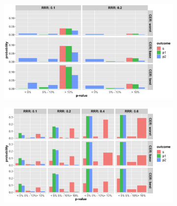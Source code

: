 \documentclass[]{article}
\begin{document}
\begin{figure}
\centering
  \caption{Probability that the p-value (from Fisher’s exact test) at termination of the trial is below 5\%, between 5\%
  and 10\% and greater than 10\% for cases where trial was (a) stopped for futility; (b) stopped for superiority. The
  rows represent the three control even rate scenarios and the columns present the relative risk reduction
  scenarios. Note: the denominator in each figure is the number of simulations (not the number of trials stopped for
  futility (a) or superiority (b), and thus, the proportions do not add up to 100\% within one figure. Further, (a) and
  (b) do not include simulations where the trial went to the max. allowed sample size. The bars should be interpreted
  with respect to the relative proportion that fit in each category.}
  \begin{subfigure}{0.8\textwidth}
    \centering
    \caption{}
    \includegraphics{../p1_plots/batch_size_nb_2000/pvalue_fut_p1.png}
  \end{subfigure}
  \bigbreak
  \begin{subfigure}{0.8\textwidth}
    \centering
    \caption{}
    \includegraphics{../p1_plots/batch_size_nb_2000/pvalue_sup_p1.png}
  \end{subfigure}
\end{figure}
\end{document}
